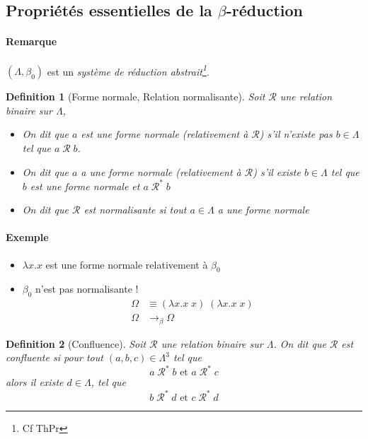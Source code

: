 \documentclass{article}
\newtheorem{defi}{Definition}
\newcommand\lterm[2]{\lambda #1. #2}
\begin{document}
\subsection*{Propriétés essentielles de la $\beta$-réduction}
\paragraph{Remarque}
$(\Lambda, \beta_0)$ est un \emph{système de réduction abstrait\footnote{Cf ThPr}}.

\begin{defi}[Forme normale, Relation normalisante]
Soit $\mathcal{R}$ une relation binaire sur $\Lambda$,
\begin{itemize}
\item On dit que $a$ \emph{est} une forme normale (relativement à $\mathcal{R}$) s'il n'existe pas $b\in \Lambda$ tel que $a\; \mathcal{R} \; b$.
\item On dit que $a$ \emph{a} une forme normale (relativement à $\mathcal{R}$) s'il existe $b\in \Lambda$ tel que $b$ \emph{est} une forme normale et $a \; \mathcal{R}^*\;b$
\item On dit que $\mathcal{R}$ est normalisante si tout $a \in \Lambda$ a une forme normale
\end{itemize}
\end{defi}


\paragraph{Exemple}
\begin{itemize}
\item $\lterm{x}{x}$ est une forme normale relativement à $\beta_0$
\item $\beta_0$ n'est pas normalisante !
\begin{align*}
\Omega & \equiv (\lterm{x}{x\; x})\; (\lterm{x}{x\; x})\\
\Omega & \to_\beta \Omega
\end{align*}
\end{itemize}

\begin{defi}[Confluence]
Soit $\mathcal{R}$ une relation binaire sur $\Lambda$. On dit que $\mathcal{R}$ est confluente si pour tout $(a,b,c) \in \Lambda^3$ tel que 
\[a \; \mathcal{R}^* \; b \text{ et } a\; \mathcal{R}^*\; c\]
alors il existe $d\in \Lambda$, tel que
\[b \; \mathcal{R}^* \; d \text{ et } c \; \mathcal{R}^* \; d\]
\end{defi}
\end{document}
